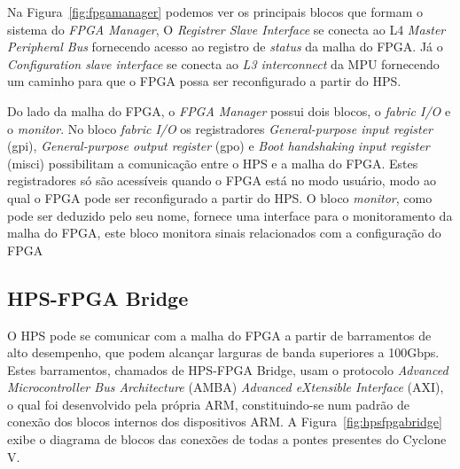 Na Figura~\ref{fig:fpgamanager} podemos ver os principais blocos que formam o sistema do \textit{FPGA Manager}, O \textit{Registrer Slave Interface} se conecta ao L4 \textit{Master Peripheral Bus} fornecendo acesso ao registro de \textit{status} da malha do FPGA\@. Já o \textit{Configuration slave interface} se conecta ao \textit{L3 interconnect} da MPU fornecendo um caminho para que o FPGA possa ser reconfigurado a partir do HPS\@.

Do lado da malha do FPGA, o \textit{FPGA Manager} possui dois blocos, o \textit{fabric I/O} e o \textit{monitor}. No bloco \textit{fabric I/O} os registradores \textit{General-purpose input register} (gpi), \textit{General-purpose output register} (gpo) e \textit{Boot handshaking input register} (misci) possibilitam a comunicação entre o HPS e a malha do FPGA\@. Estes registradores só são acessíveis quando o FPGA está no modo usuário, modo ao qual o FPGA pode ser reconfigurado a partir do HPS\@. O bloco \textit{monitor}, como pode ser deduzido pelo seu nome, fornece uma interface para o monitoramento da malha do FPGA, este bloco monitora sinais relacionados com a configuração do FPGA 


\subsection{HPS-FPGA Bridge}
O HPS pode se comunicar com a malha do FPGA a partir de barramentos de alto desempenho, que podem alcançar larguras de banda superiores a 100Gbps. Estes barramentos, chamados de HPS-FPGA Bridge, usam o protocolo \textit{Advanced Microcontroller Bus Architecture} (AMBA) \textit{Advanced eXtensible Interface} (AXI), o qual foi desenvolvido pela própria ARM, constituindo-se num padrão de conexão dos blocos internos dos dispositivos ARM\@. A Figura~\ref{fig:hpsfpgabridge} exibe o diagrama de blocos das conexões de todas a pontes presentes do Cyclone V.

